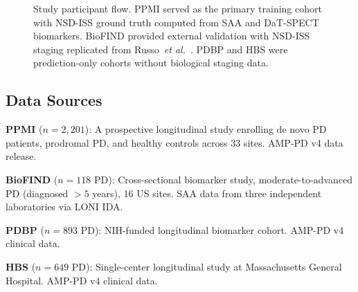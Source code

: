 \begin{figure}[!t]
\caption{Study participant flow. PPMI served as the primary training cohort with NSD-ISS ground truth computed from SAA and DaT-SPECT biomarkers. BioFIND provided external validation with NSD-ISS staging replicated from Russo~\textit{et al.}~\cite{russo2025}. PDBP and HBS were prediction-only cohorts without biological staging data.}
\label{p1:fig:consort}
\end{figure}

\subsection{Data Sources}
\textbf{PPMI} ($n{=}2{,}201$): A prospective longitudinal study enrolling de novo PD patients, prodromal PD, and healthy controls across 33 sites. AMP-PD v4 data release.

\textbf{BioFIND} ($n{=}118$ PD): Cross-sectional biomarker study, moderate-to-advanced PD (diagnosed ${>}5$ years), 16 US sites. SAA data from three independent laboratories via LONI IDA.

\textbf{PDBP} ($n{=}893$ PD): NIH-funded longitudinal biomarker cohort. AMP-PD v4 clinical data.

\textbf{HBS} ($n{=}649$ PD): Single-center longitudinal study at Massachusetts General Hospital. AMP-PD v4 clinical data.

